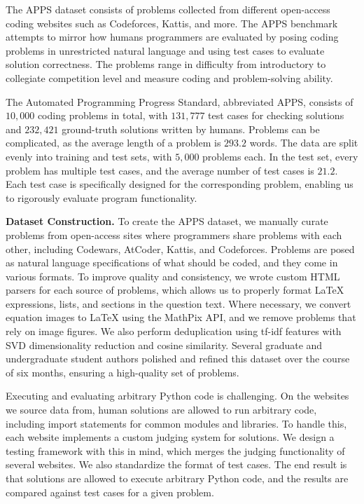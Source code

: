 \documentclass{article}
\begin{document}
The APPS dataset consists of problems collected from different open-access coding websites such as Codeforces, Kattis, and more. The APPS benchmark attempts to mirror how humans programmers are evaluated by posing coding problems in unrestricted natural language and using test cases to evaluate solution correctness. The problems range in difficulty from introductory to collegiate competition level and measure coding and problem-solving ability. 

The Automated Programming Progress Standard, abbreviated APPS, consists of $10,\!000$ coding problems in total, with $131,\!777$ test cases for checking solutions and $232,\!421$ ground-truth solutions written by humans. Problems can be complicated, as the average length of a problem is $293.2$ words.
The data are split evenly into training and test sets, with $5,\!000$ problems each. In the test set, every problem has multiple test cases, and the average number of test cases is $21.2$. Each test case is specifically designed for the corresponding problem, enabling us to rigorously evaluate program functionality.

  






\noindent\textbf{Dataset Construction.}\quad
To create the APPS dataset, we manually curate problems from open-access sites where programmers share problems with each other, including Codewars, AtCoder, Kattis, and Codeforces. Problems are posed as natural language specifications of what should be coded, and they come in various formats. To improve quality and consistency, we wrote custom HTML parsers for each source of problems, which allows us to properly format LaTeX expressions, lists, and sections in the question text. Where necessary, we convert equation images to LaTeX using the MathPix API, and we remove problems that rely on image figures. We also perform deduplication using tf-idf features with SVD dimensionality reduction and cosine similarity. Several graduate and undergraduate student authors polished and refined this dataset over the course of six months, ensuring a high-quality set of problems.

Executing and evaluating arbitrary Python code is challenging. On the websites we source data from, human solutions are allowed to run arbitrary code, including import statements for common modules and libraries. To handle this, each website implements a custom judging system for solutions. We design a testing framework with this in mind, which merges the judging functionality of several websites. We also standardize the format of test cases. The end result is that solutions are allowed to execute arbitrary Python code, and the results are compared against test cases for a given problem.
\end{document}
